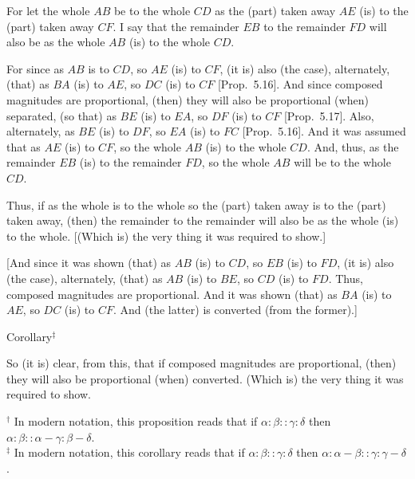 \begin{Parallel}{}{}
{\epsfysize=0.6in
\centerline{}

For let the whole $AB$ be to the whole $CD$ as the (part) taken away $AE$
(is) to the (part) taken away $CF$. I say that the remainder $EB$
to the remainder $FD$ will also be as the whole $AB$ (is) to the whole $CD$.

For since as $AB$ is to $CD$, so $AE$ (is) to $CF$, (it is) also (the case), alternately, 
(that) as $BA$ (is)
to $AE$, so $DC$ (is) to $CF$ [Prop.~5.16].
And since composed magnitudes are proportional, (then) they will also
be proportional (when) separated, (so that) as $BE$ (is) to $EA$, so $DF$ (is)
to $CF$ [Prop.~5.17].
Also, alternately, as $BE$ (is) to $DF$, so $EA$ (is) to $FC$ [Prop.~5.16]. And it was assumed that as
$AE$ (is) to $CF$, so the whole $AB$ (is) to the whole $CD$. And, thus,  as the
remainder $EB$ (is) to the remainder $FD$, so the whole $AB$ will be to the
whole $CD$.

Thus, if as the whole is to the whole so the (part) taken
away is to the (part) taken away, (then) the remainder to the remainder will
also be as the whole (is) to the whole. [(Which is) the very thing it was required to show.]

\mbox{[}And since it was shown (that) as $AB$ (is) to $CD$, so $EB$ (is) to $FD$, (it is)
also (the case), alternately, (that) as $AB$ (is) to $BE$, so $CD$ (is) to $FD$. 
Thus, composed magnitudes are proportional. And it was shown
(that) as $BA$ (is) to $AE$, so $DC$ (is) to $CF$. And (the latter) is converted (from the former).]\\

\begin{center}
{\large Corollary}$^\ddag$
\end{center}\vspace*{-7pt}

So (it is) clear, from this, that if composed magnitudes are proportional,
 (then) they will also be proportional (when) converted.
(Which is) the very thing it was required to show.}
\end{Parallel}
{\footnotesize \noindent$^\dag$ In modern notation, this proposition
reads that if $\alpha:\beta::\gamma:\delta$ then
$\alpha:\beta::\alpha-\gamma:\beta-\delta$.\\[0.5ex]
$^\ddag$ In modern notation, this corollary reads
that if $\alpha:\beta::\gamma:\delta$ then $\alpha:\alpha-\beta::\gamma:\gamma-\delta$.}

